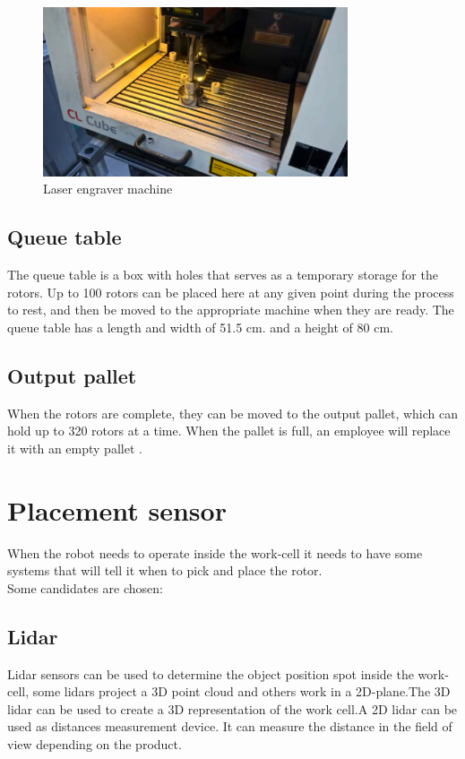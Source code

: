   \begin{figure}[H]
    \centering
    \includegraphics[width=9cm]{InitialProblemstatement/Case/engrave.PNG}
    \caption{Laser engraver machine\cite{Case}}
    \label{fig:Laserengravermachine}
  \end{figure}
  
 \subsection{Queue table}
 The queue table is a box with holes that serves as a temporary storage for the rotors. Up to 100 rotors can be placed here at any given point during the process to rest, and then be moved to the appropriate machine when they are ready. The queue table has a length and width of 51.5 cm. and a height of 80 cm\cite{Case}.\\  
 
 \subsection{Output pallet}
 When the rotors are complete, they can be moved to the output pallet, which can hold up to 320 rotors at a time. When the pallet is full, an employee will replace it with an empty pallet \cite{Case}.\\ 
 
 \section{Placement sensor}\label{ref:PlacementS}
 
 When the robot needs to operate inside the work-cell it needs to have some systems that will tell it when to pick and place the rotor.\\
 Some candidates are chosen:\\

 
  \subsection{Lidar} 
  Lidar sensors can be used to determine the object position spot inside the work-cell, some lidars project a 3D point cloud and others work in a 2D-plane\cite{Lidar}.The 3D lidar can be used to create a 3D representation of the work cell.A 2D lidar can be used as distances measurement device. It can measure the distance in the field of view depending on the product\cite{Lidar}.\\

